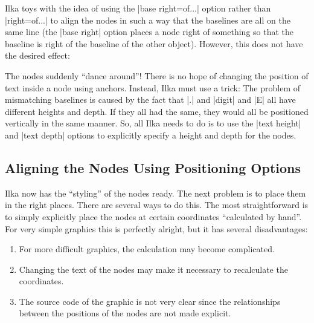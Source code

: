 Ilka toys with the idea of using the |base right=of...| option rather than
|right=of...| to align the nodes in such a way that the baselines are all on
the same line (the |base right| option places a node right of something so that
the baseline is right of the baseline of the other object). However, this does
not have the desired effect:
%
\begin{codeexample}[libraries/tikz={positioning,shapes.misc}]
\end{codeexample}
%
The nodes suddenly ``dance around''! There is no hope of changing the position
of text inside a node using anchors. Instead, Ilka must use a trick: The
problem of mismatching baselines is caused by the fact that |.| and |digit| and
|E| all have different heights and depth. If they all had the same, they would
all be positioned vertically in the same manner. So, all Ilka needs to do is to
use the |text height| and |text depth| options to explicitly specify a height
and depth for the nodes.
%
\begin{codeexample}[libraries/tikz={positioning,shapes.misc}]
\end{codeexample}


\subsection{Aligning the Nodes Using Positioning Options}

Ilka now has the ``styling'' of the nodes ready. The next problem is to place
them in the right places. There are several ways to do this. The most
straightforward is to simply explicitly place the nodes at certain coordinates
``calculated by hand''. For very simple graphics this is perfectly alright, but
it has several disadvantages:
%
\begin{enumerate}
    \item For more difficult graphics, the calculation may become
        complicated.
    \item Changing the text of the nodes may make it necessary to recalculate
        the coordinates.
    \item The source code of the graphic is not very clear since the
        relationships between the positions of the nodes are not made
        explicit.
\end{enumerate}

